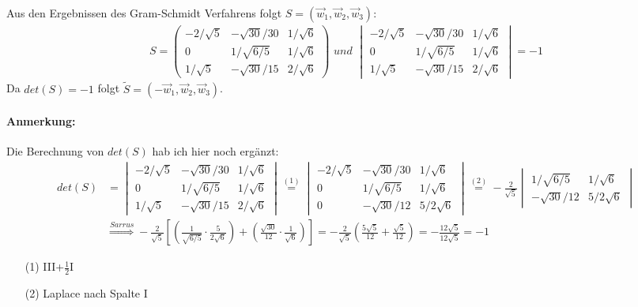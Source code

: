 \documentclass[titlepage]{article}
\newcommand{\1}{\mathbb{1}}
\newcommand{\0}{\mathbb{0}}
\newcommand{\detZ}[4]{\begin{vmatrix}#1&#2\\#3&#4\end{vmatrix}}
\newcommand{\detD}[9]{\begin{vmatrix}#1&#2&#3\\#4&#5&#6\\#7&#8&#9\end{vmatrix}}
\newcommand{\matrixD}[9]{\begin{pmatrix}#1&#2&#3\\#4&#5&#6\\#7&#8&#9\end{pmatrix}}
\begin{document}
	Aus den Ergebnissen des Gram-Schmidt Verfahrens folgt $S=(\vec{w}_1,\vec{w}_2,\vec{w}_3)$:
	\begin{align*}
		S=\matrixD{-2/\sqrt{5}}{-\sqrt{30}/30}{1/\sqrt{6}}{0}{1/\sqrt{6/5}}{1/\sqrt{6}}{1/\sqrt{5}}{-\sqrt{30}/15}{2/\sqrt{6}}\textit{ und }\detD{-2/\sqrt{5}}{-\sqrt{30}/30}{1/\sqrt{6}}{0}{1/\sqrt{6/5}}{1/\sqrt{6}}{1/\sqrt{5}}{-\sqrt{30}/15}{2/\sqrt{6}}=-1
	\end{align*}
	Da $det(S)=-1$ folgt $\tilde{S}=(-\vec{w}_1,\vec{w}_2,\vec{w}_3)$. 
	
	\paragraph{Anmerkung:} Die Berechnung von $det(S)$ hab ich hier noch ergänzt:
	\begin{align*}
		det(S)&=\detD{-2/\sqrt{5}}{-\sqrt{30}/30}{1/\sqrt{6}}{0}{1/\sqrt{6/5}}{1/\sqrt{6}}{1/\sqrt{5}}{-\sqrt{30}/15}{2/\sqrt{6}}\overset{(1)}{=}\detD{-2/\sqrt{5}}{-\sqrt{30}/30}{1/\sqrt{6}}{0}{1/\sqrt{6/5}}{1/\sqrt{6}}{0}{-\sqrt{30}/12}{5/2\sqrt{6}}\overset{(2)}{=}-\frac{2}{\sqrt{5}}\detZ{1/\sqrt{6/5}}{1/\sqrt{6}}{-\sqrt{30}/12}{5/2\sqrt{6}}\\
		&\overset{Sarrus}{\Rightarrow}-\frac{2}{\sqrt{5}}\left[\left(\frac{1}{\sqrt{6/5}}\cdot\frac{5}{2\sqrt{6}}\right)+\left(\frac{\sqrt{30}}{12}\cdot\frac{1}{\sqrt{6}}\right)\right]=-\frac{2}{\sqrt{5}}\left(\frac{5\sqrt{5}}{12}+\frac{\sqrt{5}}{12}\right)=-\frac{12\sqrt{5}}{12\sqrt{5}}=-1
	\end{align*}
	\begin{enumerate}
		\item[(1)] III+$\frac{1}{2}$I
		\item[(2)] Laplace nach Spalte I
	\end{enumerate}
\end{document}
